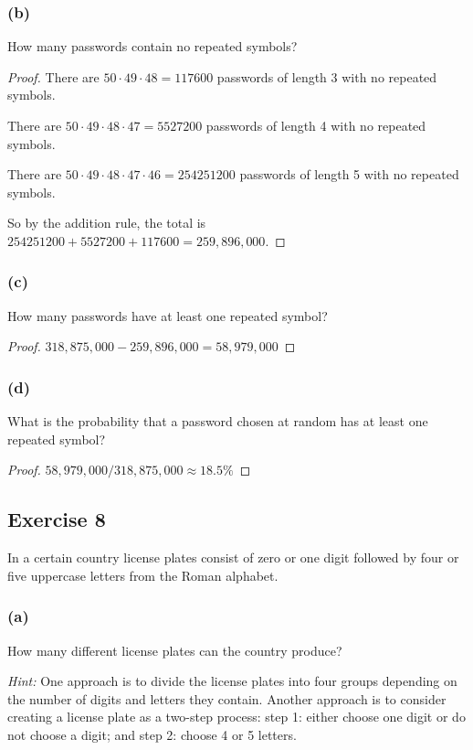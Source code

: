 \documentclass[14pt]{extarticle}
\begin{document}
\subsubsection{(b)}
How many passwords contain no repeated symbols?

\begin{proof}
There are \(50 \cdot 49 \cdot 48 = 117600\) passwords of length 3 with no repeated symbols.

There are \(50 \cdot 49 \cdot 48 \cdot 47 = 5527200\) passwords of length 4 with no repeated symbols.

There are \(50 \cdot 49 \cdot 48 \cdot 47 \cdot 46 = 254251200\) passwords of length 5 with no repeated symbols.

So by the addition rule, the total is \(254251200 + 5527200 + 117600 = 259,896,000\).
\end{proof}

\subsubsection{(c)}
How many passwords have at least one repeated symbol?

\begin{proof}
\(318,875,000 - 259,896,000 = 58,979,000\)
\end{proof}

\subsubsection{(d)}
What is the probability that a password chosen at random has at least one repeated symbol?

\begin{proof}
\(58,979,000 / 318,875,000 \approx 18.5\% \)
\end{proof}

\subsection{Exercise 8}
In a certain country license plates consist of zero or one digit followed by four or five uppercase letters from the 
Roman alphabet.

\subsubsection{(a)}
How many different license plates can the country produce?

{\it Hint:} One approach is to divide the license plates into four groups depending on the number of digits and 
letters they contain. Another approach is to consider creating a license plate as a two-step process: step 1: 
either choose one digit or do not choose a digit; and step 2: choose 4 or 5 letters.
\end{document}
